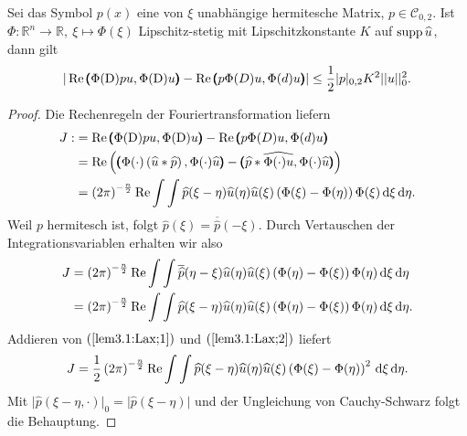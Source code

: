 \begin{lem}
	Sei das Symbol $p(x)$ eine von $\xi$ unabhängige hermitesche Matrix, $p\in \mathcal{C}_{0,2}$. Ist $\Phi: \mathbb{R}^n\rightarrow\mathbb{R}, \ \xi \mapsto\Phi(\xi)$ Lipschitz-stetig mit Lipschitzkonstante $K$ auf $\operatorname{supp} \widehat{u}$, dann gilt
	\begin{align}
		\vert \operatorname{Re} \pmb(\Phi(\mathrm D)pu,\Phi(\mathrm D)u\pmb)-\operatorname{Re}\pmb(p\Phi(D)u,\Phi(d)u\pmb)\vert \le\frac{1}{2}\vert p\vert_{0,2}K^2\vert\vert u\vert\vert_0^2.
\end{align}	 
\begin{proof}
	Die Rechenregeln der Fouriertransformation liefern
	\begin{align}\label{lem3.1:Lax;1}
		\begin{split} J:&=  \operatorname{Re} \pmb(\Phi(\mathrm D)pu,\Phi(\mathrm D)u\pmb)-\operatorname{Re}\pmb(p\Phi(D)u,\Phi(d)u\pmb) \\
		&=\operatorname{Re} \left( \pmb(\Phi(\cdot)\left(\widehat{u}\ast \widehat{p}\right),\Phi(\cdot)\widehat{u}\pmb)-\pmb(\widehat{p}\ast\widehat{\Phi(\cdot)u},\Phi(\cdot)\widehat{u}\pmb)\right)\\
		&= \left(2\pi\right)^{-\frac{n}{2}}\operatorname{Re}\int\int\widehat{p}(\xi-\eta)\widehat{u}(\eta)\widehat{u}(\xi)\left(\Phi(\xi)-\Phi(\eta)\right)\Phi(\xi)\,\mathrm d \xi\,\mathrm d\eta.
		\end{split}
	\end{align}
	Weil $p$ hermitesch ist, folgt $\widehat{p}(\xi) = \overline{\widehat{p}}(-\xi)$. Durch Vertauschen der Integrationsvariablen erhalten wir also
	\begin{align}\label{lem3.1:Lax;2}
	\begin{split}	J&= \left(2\pi\right)^{-\frac{n}{2}}\operatorname{Re}\int\int\overline{\widehat{p}}(\eta-\xi)\widehat{u}(\eta)\widehat{u}(\xi)\left(\Phi(\eta)-\Phi(\xi)\right)\Phi(\eta)\,\mathrm d \xi\,\mathrm d\eta\\
		&= \left(2\pi\right)^{-\frac{n}{2}}\operatorname{Re}\int\int\widehat{p}(\xi-\eta)\widehat{u}(\eta)\widehat{u}(\xi)\left(\Phi(\eta)-\Phi(\xi)\right)\Phi(\eta)\,\mathrm d \xi\,\mathrm d\eta.
	\end{split}	
	\end{align}
	Addieren von $(\ref{lem3.1:Lax;1})$ und $(\ref{lem3.1:Lax;2})$ liefert
	\begin{align}
		J= \frac{1}{2}\left(2\pi\right)^{-\frac{n}{2}}\operatorname{Re}\int\int \widehat{p}(\xi-\eta)\widehat{u}(\eta)\widehat{u}(\xi)\left(\Phi(\xi)-\Phi(\eta)\right)^2\,\mathrm d\xi\,\mathrm d\eta.
	\end{align}
	Mit $\vert \widehat{p}(\xi-\eta,\cdot)\vert_0 = \vert \widehat{p}(\xi-\eta)\vert$ und der Ungleichung von Cauchy-Schwarz folgt die Behauptung. 
\end{proof}
\end{lem}


